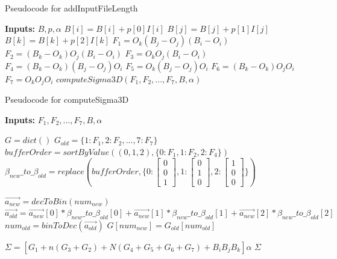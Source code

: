 \documentclass[conference]{IEEEtran}
\begin{document}
  \begin{algorithm}[h]
    \caption{Pseudocode for addInputFileLength}

    \begin{algorithmic}[1]

    \STATE \textbf{Inputs:} $B, p, \alpha$
    \STATE $B[i] = B[i] + p[0]I[i]$
    \STATE $B[j] = B[j] + p[1]I[j]$
    \STATE $B[k] = B[k] + p[2]I[k]$
    \STATE $F_1 = O_k (B_j - O_j) (B_i - O_i)$
    \STATE $F_2 = (B_k - O_k) O_j (B_i - O_i)$
    \STATE $F_3 = O_k O_j (B_i-O_i)$
    \STATE $F_4 = (B_k-O_k) (B_j-O_j) O_i$
    \STATE $F_5 = O_k (B_j-O_j) O_i$
    \STATE $F_6 = (B_k - O_k) O_j O_i$
    \STATE $F_7 = O_k O_j O_i$
    \RETURN $computeSigma3D(F_1, F_2, ..., F_7, B, \alpha)$ %

    \end{algorithmic}
    \label{algo:addInputFileLength}
  \end{algorithm}

  \begin{algorithm}[h]
    \caption{Pseudocode for computeSigma3D}

    \begin{algorithmic}[1]
    \STATE \textbf{Inputs:} $F_1, F_2, ..., F_7, B, \alpha$

    \STATE $G = dict()$
    \STATE $G_{old} = \{ 1: F_1, 2: F_2,..., 7: F_7\}$
    \STATE $bufferOrder = sortByValue((0,1,2), \{ 0:F_1, 1:F_2, 2:F_4\})$ %
    \STATE $\beta_{new}\_to\_\beta_{old} = replace(bufferOrder, \{
      0:\begin{bmatrix} 0 \\ 0 \\ 1 \end{bmatrix},
      1:\begin{bmatrix} 0 \\ 1 \\ 0 \end{bmatrix},
      2:\begin{bmatrix} 1 \\ 0 \\ 0 \end{bmatrix}
    \} )$ %

      \STATE $\vec{a_{new}} = decToBin(num_{new})$ %
      \STATE $\vec{a_{old}} = \vec{a_{new}}[0] * \beta_{new}\_to\_\beta_{old}[0]
        + \vec{a_{new}}[1] * \beta_{new}\_to\_\beta_{old}[1]
        + \vec{a_{new}}[2] * \beta_{new}\_to\_\beta_{old}[2]$
      \STATE $num_{old} = binToDec(\vec{a_{old}})$
      \STATE $G[num_{new}] = G_{old}[num_{old}]$
    \ENDFOR

    \STATE $\Sigma = [G_1 + n(G_3 + G_2) + N(G_4 + G_5 + G_6 + G_7) + B_iB_jB_k]\alpha$
    \RETURN $\Sigma$
    \end{algorithmic}
    \label{algo:computeSigma3D}
  \end{algorithm}
\end{document}
